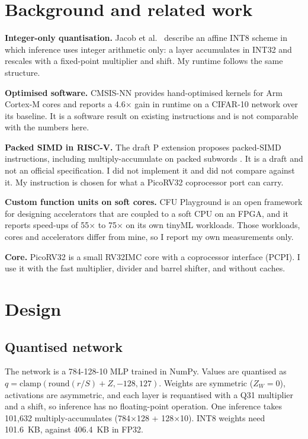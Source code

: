\documentclass[10pt,a4paper]{article}
\begin{document}
\section{Background and related work}
\textbf{Integer-only quantisation.} Jacob et al.\ \cite{jacob2018} describe an affine INT8 scheme in which inference uses integer arithmetic only: a layer accumulates in INT32 and rescales with a fixed-point multiplier and shift. My runtime follows the same structure.

\textbf{Optimised software.} CMSIS-NN \cite{lai2018} provides hand-optimised kernels for Arm Cortex-M cores and reports a 4.6$\times$ gain in runtime on a CIFAR-10 network over its baseline. It is a software result on existing instructions and is not comparable with the numbers here.

\textbf{Packed SIMD in RISC-V.} The draft P extension proposes packed-SIMD instructions, including multiply-accumulate on packed subwords \cite{hauser}. It is a draft and not an official specification. I did not implement it and did not compare against it. My instruction is chosen for what a PicoRV32 coprocessor port can carry.

\textbf{Custom function units on soft cores.} CFU Playground \cite{prakash2023} is an open framework for designing accelerators that are coupled to a soft CPU on an FPGA, and it reports speed-ups of 55$\times$ to 75$\times$ on its own tinyML workloads. Those workloads, cores and accelerators differ from mine, so I report my own measurements only.

\textbf{Core.} PicoRV32 \cite{picorv32} is a small RV32IMC core with a coprocessor interface (PCPI). I use it with the fast multiplier, divider and barrel shifter, and without caches.

\section{Design}
\subsection{Quantised network}
The network is a 784-128-10 MLP trained in NumPy. Values are quantised as $q=\mathrm{clamp}(\mathrm{round}(r/S)+Z,-128,127)$. Weights are symmetric ($Z_W=0$), activations are asymmetric, and each layer is requantised with a Q31 multiplier and a shift, so inference has no floating-point operation. One inference takes 101,632 multiply-accumulates (784$\times$128 + 128$\times$10). INT8 weights need 101.6~KB, against 406.4~KB in FP32.
\end{document}

